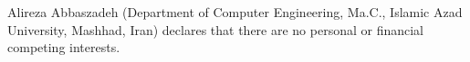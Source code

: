 Alireza Abbaszadeh (Department of Computer Engineering, Ma.C., Islamic Azad University, Mashhad, Iran) declares that there are no personal or financial competing interests.
